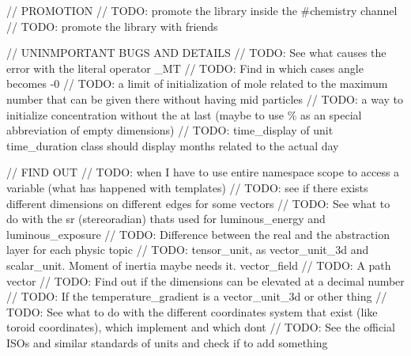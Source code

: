 // PROMOTION // TODO\+: promote the library inside the \#chemistry channel // TODO\+: promote the library with friends

// UNINMPORTANT BUGS AND DETAILS // TODO\+: See what causes the error with the literal operator \+\_\+\+MT // TODO\+: Find in which cases angle becomes -\/0 // TODO\+: a limit of initialization of mole related to the maximum number that can be given there without having mid particles // TODO\+: a way to initialize concentration without the \textquotesingle{} \textquotesingle{} at last (maybe to use \% as an special abbreviation of empty dimensions) // TODO\+: time\+\_\+display of unit time\+\_\+duration class should display months related to the actual day

// FIND OUT // TODO\+: when I have to use entire namespace scope to access a variable (what has happened with templates) // TODO\+: see if there exists different dimensions on different edges for some vectors // TODO\+: See what to do with the sr (stereoradian) that\textquotesingle{}s used for luminous\+\_\+energy and luminous\+\_\+exposure // TODO\+: Difference between the real and the abstraction layer for each physic topic // TODO\+: tensor\+\_\+unit, as vector\+\_\+unit\+\_\+3d and scalar\+\_\+unit. Moment of inertia maybe needs it. vector\+\_\+field // TODO\+: A path vector // TODO\+: Find out if the dimensions can be elevated at a decimal number // TODO\+: If the temperature\+\_\+gradient is a vector\+\_\+unit\+\_\+3d or other thing // TODO\+: See what to do with the different coordinates system that exist (like toroid coordinates), which implement and which don\textquotesingle{}t // TODO\+: See the official ISOs and similar standards of units and check if to add something 